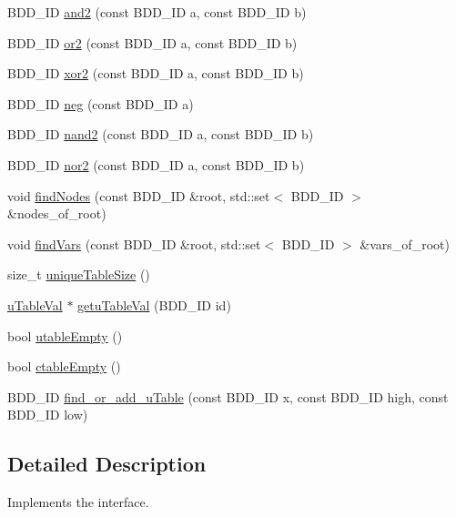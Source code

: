 \begin{DoxyCompactItemize}
B\+D\+D\+\_\+\+ID \hyperlink{classManager_a029fff4ef6650e4fd1f0ff37a69252de}{and2} (const B\+D\+D\+\_\+\+ID a, const B\+D\+D\+\_\+\+ID b)
\item 
B\+D\+D\+\_\+\+ID \hyperlink{classManager_a0f415b7af83a3efb6f7020650e68f1c3}{or2} (const B\+D\+D\+\_\+\+ID a, const B\+D\+D\+\_\+\+ID b)
\item 
B\+D\+D\+\_\+\+ID \hyperlink{classManager_a2582e9a9474189a2710c551548c20c19}{xor2} (const B\+D\+D\+\_\+\+ID a, const B\+D\+D\+\_\+\+ID b)
\item 
B\+D\+D\+\_\+\+ID \hyperlink{classManager_ab53a25ffc83724427725347ed3f9e6ce}{neg} (const B\+D\+D\+\_\+\+ID a)
\item 
B\+D\+D\+\_\+\+ID \hyperlink{classManager_abde082c99a3588ad7e25b620e901e6e0}{nand2} (const B\+D\+D\+\_\+\+ID a, const B\+D\+D\+\_\+\+ID b)
\item 
B\+D\+D\+\_\+\+ID \hyperlink{classManager_a1cbba8dc08a8c1bbabce0b98a8fde3be}{nor2} (const B\+D\+D\+\_\+\+ID a, const B\+D\+D\+\_\+\+ID b)
\item 
void \hyperlink{classManager_a2aefec8f025f8d7417eff8493bcd7f04}{find\+Nodes} (const B\+D\+D\+\_\+\+ID \&root, std\+::set$<$ B\+D\+D\+\_\+\+ID $>$ \&nodes\+\_\+of\+\_\+root)
\item 
void \hyperlink{classManager_abf869470f4d1baffca8a140d3196c2ad}{find\+Vars} (const B\+D\+D\+\_\+\+ID \&root, std\+::set$<$ B\+D\+D\+\_\+\+ID $>$ \&vars\+\_\+of\+\_\+root)
\item 
size\+\_\+t \hyperlink{classManager_a82b10a42ec726d42ea4d2e8bc72a3db9}{unique\+Table\+Size} ()
\item 
\hyperlink{structuTableVal}{u\+Table\+Val} $\ast$ \hyperlink{classManager_ac08dabf8fdbc314abf2f9a566089c9c7}{getu\+Table\+Val} (B\+D\+D\+\_\+\+ID id)
\item 
bool \hyperlink{classManager_afc3f9c453c3afb8024d811edfeb0e7e5}{utable\+Empty} ()
\item 
bool \hyperlink{classManager_a8be64b55798d49545a549266ae1e9281}{ctable\+Empty} ()
\item 
B\+D\+D\+\_\+\+ID \hyperlink{classManager_a35b9aaf1d448fdbdc2020b119d729527}{find\+\_\+or\+\_\+add\+\_\+u\+Table} (const B\+D\+D\+\_\+\+ID x, const B\+D\+D\+\_\+\+ID high, const B\+D\+D\+\_\+\+ID low)
\end{DoxyCompactItemize}


\subsection{Detailed Description}
Implements the interface. 

